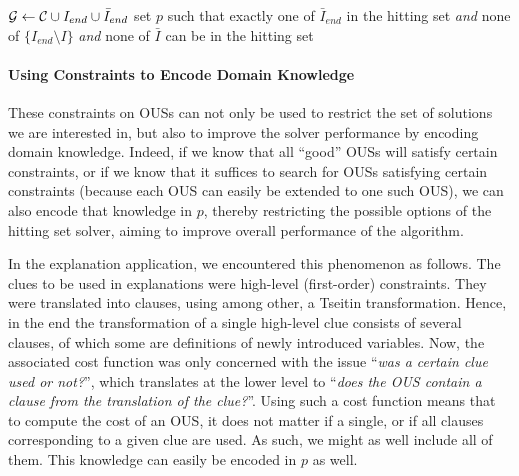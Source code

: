\begin{algorithm}[ht]
  \caption{$\call{bestStep--c-OUS}({\cal C},f,I,I_{end})$}
  \label{alg:singleStepExplain3}
$\mathcal{G}  \gets {\cal C} \cup I_{end} \cup \bar{I}_{end}$\;
set $p$ such that exactly one of $\bar{I}_{end}$ in the hitting set \textit{and} none of $\{I_{end} \setminus I\}$ \textit{and} none of $\bar{I}$ can be in the hitting set\;
\;
\end{algorithm}



\paragraph{Using Constraints to Encode Domain Knowledge}
These constraints on OUSs can not only be used to restrict the set of solutions we are interested in, but also to improve the solver performance by encoding domain knowledge.
Indeed, if we know that all ``good'' OUSs will satisfy certain constraints, or if we know that it suffices to search for OUSs satisfying certain constraints (because each OUS can easily be extended to one such OUS),  we can also encode that knowledge in $p$, thereby restricting the possible options of the hitting set solver, aiming to improve overall performance of the algorithm. 

In the explanation application, we encountered this phenomenon as follows. 
The clues to be used in explanations were high-level (first-order) constraints. They were translated into clauses, using among other, a Tseitin transformation.
Hence, in the end the transformation of a single high-level clue consists of several clauses, of which some are definitions of newly introduced variables. 
Now, the associated cost function was only concerned with the issue ``\emph{was a certain clue used or not?}'', which translates at the lower level to ``\emph{does the OUS contain a clause from the translation of the clue?}''.
Using such a cost function means that to compute the cost of an OUS, it does not matter if a single, or if all clauses corresponding to a given clue are used. As such, we might as well include all of them. This knowledge can easily be encoded in $p$ as well. 

